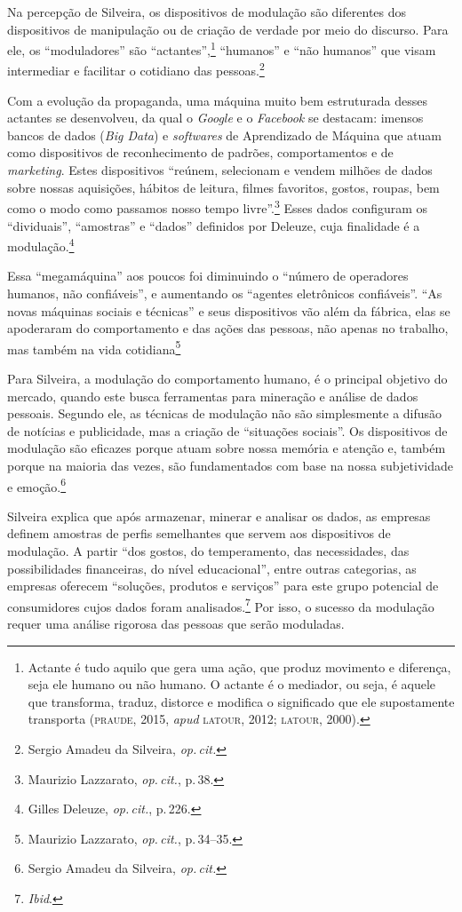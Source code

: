 Na percepção de Silveira, os dispositivos de modulação são
diferentes dos dispositivos de manipulação ou de criação de verdade por
meio do discurso. Para ele, os ``moduladores'' são
``actantes'',\footnote{Actante é tudo aquilo que gera uma ação, que
  produz movimento e diferença, seja ele humano ou não humano. O actante
  é o mediador, ou seja, é aquele que transforma, traduz, distorce e
  modifica o significado que ele supostamente transporta (\textsc{praude}, 2015,
  \textit{apud} \textsc{latour}, 2012; \textsc{latour}, 2000).} ``humanos'' e ``não humanos'' que visam intermediar e facilitar o cotidiano das pessoas.\footnote{Sergio Amadeu da Silveira, \textit{op.\,cit.}}

Com a evolução da propaganda, uma máquina muito bem estruturada desses
actantes se desenvolveu, da qual o \textit{Google} e o \textit{Facebook} se
destacam: imensos bancos de dados (\textit{Big Data}) e \textit{softwares} de
Aprendizado de Máquina que atuam como dispositivos de reconhecimento de
padrões, comportamentos e de \textit{marketing}. Estes dispositivos ``reúnem,
selecionam e vendem milhões de dados sobre nossas aquisições, hábitos de
leitura, filmes favoritos, gostos, roupas, bem como o modo como passamos
nosso tempo livre''.\footnote{Maurizio Lazzarato, \textit{op.\,cit.}, p.\,38.} Esses dados configuram os ``dividuais'', ``amostras'' e ``dados'' definidos por Deleuze, cuja
finalidade é a modulação.\footnote{Gilles Deleuze, \textit{op.\,cit.}, p.\,226.}

Essa ``megamáquina'' aos poucos foi diminuindo o ``número de operadores
humanos, não confiáveis'', e aumentando os ``agentes eletrônicos
confiáveis''. ``As novas máquinas sociais e técnicas'' e seus
dispositivos vão além da fábrica, elas se apoderaram do comportamento e
das ações das pessoas, não apenas no trabalho, mas também na vida
cotidiana\footnote{Maurizio Lazzarato, \textit{op.\,cit.}, p.\,34--35.}

Para Silveira, a modulação do comportamento humano, é o principal
objetivo do mercado, quando este busca ferramentas para mineração e
análise de dados pessoais. Segundo ele, as técnicas de modulação não são
simplesmente a difusão de notícias e publicidade, mas a criação de
``situações sociais''. Os dispositivos de modulação são eficazes porque
atuam sobre nossa memória e atenção e, também porque na maioria das
vezes, são fundamentados com base na nossa subjetividade e emoção.\footnote{Sergio Amadeu da Silveira, \textit{op.\,cit.}}

Silveira explica que após armazenar, minerar e analisar os dados,
as empresas definem amostras de perfis semelhantes que servem aos
dispositivos de modulação. A partir ``dos gostos, do temperamento, das
necessidades, das possibilidades financeiras, do nível educacional'',
entre outras categorias, as empresas oferecem ``soluções, produtos e
serviços'' para este grupo potencial de consumidores cujos dados foram
analisados.\footnote{\textit{Ibid}.} Por isso, o sucesso da modulação requer uma
análise rigorosa das pessoas que serão moduladas.

